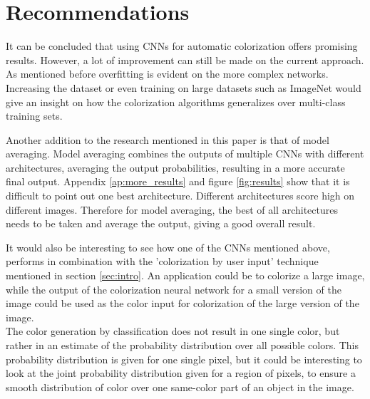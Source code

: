 \section{Recommendations}
\label{sec:recommendations}


It can be concluded that using CNNs for automatic colorization offers promising results. However, a lot of improvement can still be made on the current approach. As mentioned before overfitting is evident on the more complex networks. Increasing the dataset or even training on large datasets such as ImageNet \cite{deng2009imagenet} would give an insight on how the colorization algorithms generalizes over multi-class training sets. 

Another addition to the research mentioned in this paper is that of model averaging. Model averaging combines the outputs of multiple CNNs with different architectures, averaging the output probabilities, resulting in a more accurate final output. Appendix \ref{ap:more_results} and figure \ref{fig:results} show that it is difficult to point out one best architecture. Different architectures score high on different images. Therefore for model averaging, the best of all architectures needs to be taken and average the output, giving a good overall result.

It would also be interesting to see how one of the CNNs mentioned above, performs in combination with the 'colorization by user input' technique mentioned in section \ref{sec:intro}. An application could be to colorize a large image, while the output of the colorization neural network for a small version of the image could be used as the color input for colorization of the large version of the image.\\

The color generation by classification does not result in one single color, but rather in an estimate of the probability distribution over all possible colors. This probability distribution is given for one single pixel, but it could be interesting to look at the joint probability distribution given for a region of pixels, to ensure a smooth distribution of color over one same-color part of an object in the image.


